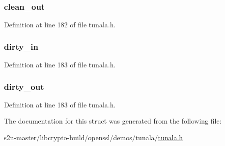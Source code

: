 \subsubsection[{\texorpdfstring{clean\+\_\+out}{clean_out}}]{ clean\+\_\+out}\hypertarget{struct__state__machine__t_ab22987adaef1c06b920f04a14de9b31e}{}\label{struct__state__machine__t_ab22987adaef1c06b920f04a14de9b31e}


Definition at line 182 of file tunala.\+h.

\subsubsection[{\texorpdfstring{dirty\+\_\+in}{dirty_in}}]{ dirty\+\_\+in}\hypertarget{struct__state__machine__t_a087e59ab12b72ec4e9df647c90d2b29b}{}\label{struct__state__machine__t_a087e59ab12b72ec4e9df647c90d2b29b}


Definition at line 183 of file tunala.\+h.

\subsubsection[{\texorpdfstring{dirty\+\_\+out}{dirty_out}}]{ dirty\+\_\+out}\hypertarget{struct__state__machine__t_a99e2f9c81dd49292bb417d57cf2b50a9}{}\label{struct__state__machine__t_a99e2f9c81dd49292bb417d57cf2b50a9}


Definition at line 183 of file tunala.\+h.



The documentation for this struct was generated from the following file\+:\begin{DoxyCompactItemize}
\item 
s2n-\/master/libcrypto-\/build/openssl/demos/tunala/\hyperlink{tunala_8h}{tunala.\+h}\end{DoxyCompactItemize}
